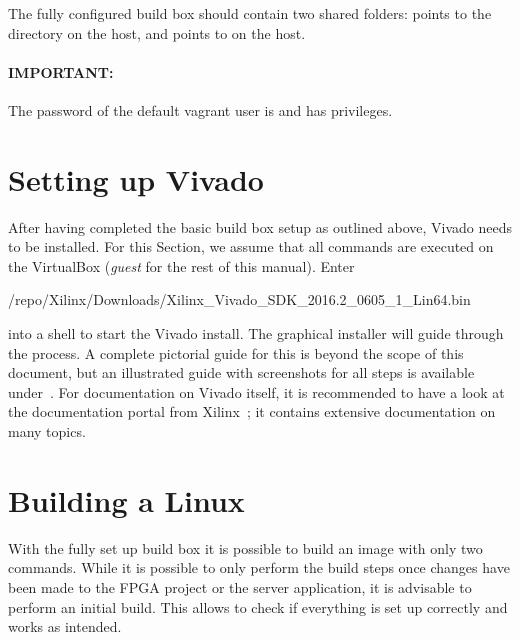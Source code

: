 The  fully   configured  build   box  should   contain  two   shared  folders:
  points  to  the   directory  on  the  host,  and
 points to \code{/} on the host.

\paragraph{IMPORTANT:} The   password  of   the   default   vagrant  user   is
\textbf{} and has  privileges.


\section{Setting up Vivado} %
\label{sec:devguide:fpga_toolchain:vivado}

After having  completed the basic  build box  setup as outlined  above, Vivado
needs to  be installed.   For this  Section, we assume  that all  commands are
executed on the VirtualBox (\emph{guest} for the rest of this manual).  Enter
\begin{commandshell}
    /repo/Xilinx/Downloads/Xilinx_Vivado_SDK_2016.2_0605_1_Lin64.bin
\end{commandshell}
\noindent into a  shell to start the Vivado install.   The graphical installer
will guide through the process. A complete  pictorial guide for this is beyond
the scope of this document, but  an illustrated guide with screenshots for all
steps  is available  under~\cite{vivado-install-guide}.  For  documentation on
Vivado  itself,  it  is  recommended  to have  a  look  at  the  documentation
portal from  Xilinx~\cite{xilinx:documentation-portal}; it  contains extensive
documentation on many topics.

\section{Building a Linux} %
\label{sec:devguide:fpga_toolchain:linux}

With the fully set up build box it is possible to build an image with only two
commands. While it  is possible to only  perform the build steps  once changes
have been made to the FPGA project  or the server application, it is advisable
to perform  an initial  build. This allows  to check if  everything is  set up
correctly and works as intended.

